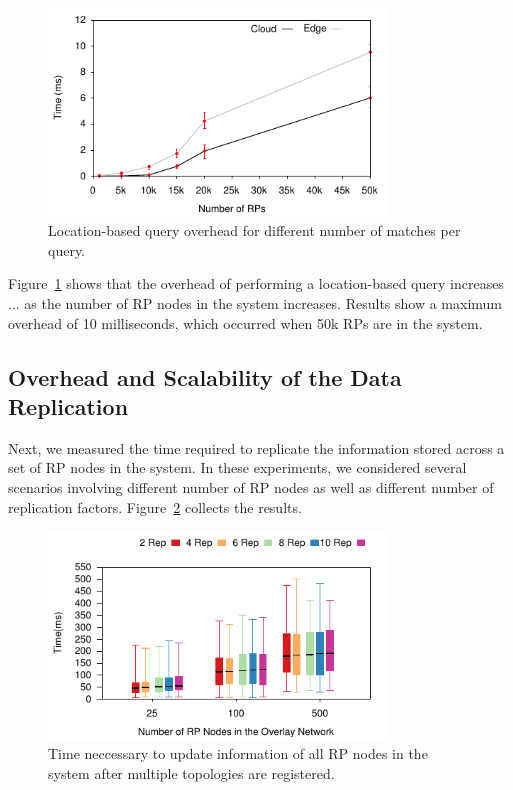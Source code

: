 \begin{figure}[htb!]
  \centering
    \includegraphics[width=0.8\textwidth]{Figures/OSLocation.pdf}
  \caption{Location-based query overhead for different number of matches per query.} \label{fig:oslocation}
\end{figure}

Figure~\ref{fig:oslocation} shows that the overhead of performing a location-based query increases ... as the number of RP nodes in the system increases. Results show a maximum overhead of 10 milliseconds, which occurred when 50k RPs are in the system. 

\subsection{Overhead and Scalability of the Data Replication}

Next, we measured the time required to replicate the information stored across a set of RP nodes in the system. In these experiments, we considered several scenarios involving different number of RP nodes as well as different number of replication factors. Figure~\ref{fig:topology} collects the results. 

\begin{figure}[htb!]
  \centering
    \includegraphics[width=0.8\textwidth]{Results/ReplicationOver.pdf}
  \caption{Time neccessary to update information of all RP nodes in the system after multiple topologies are registered.} \label{fig:topology}
    \vspace{-2ex}
\end{figure}

